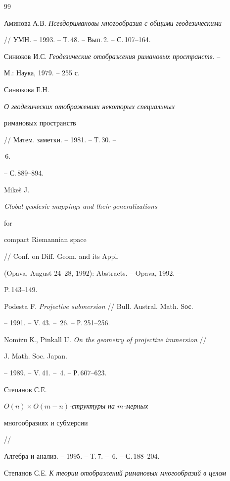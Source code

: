 \begin{thebibliography}{99} 


 




Аминова А.В. {\em Псевдоримановы многообразия с общими геодезическими} 


// УМН. -- 1993. -- Т.\,48. -- Вып.\,2. -- С.\,107--164. 




Синюков И.С. {\em Геодезические отображения римановых пространств}. -- 


М.: Наука, 1979. -- 255 с. 




Синюкова Е.Н. {\em О геодезических отображениях некоторых специальных 


римановых пространств} // Матем. заметки. -- 1981. -- Т.\,30. -- 


\No\,6. 


-- С.\,889--894. 




Mike\v{s} J. {\em Global geodesic mappings and their generalizations 


for 


compact Riemannian space} // Conf. on Diff. Geom. and its Appl. 


(Opava, August 24--28, 1992): Abstracts. -- Opava, 1992. -- 


P.\,143--149. 




Podesta F. {\em Projective submersion} // Bull. Austral. Math. Sос. 


-- 1991. -- V.\,43. -- \No\,26. -- Р.\,251--256. %




Nomizu К., Pinkall U. {\em On the geometry of projective immersion} // 


J. Math. Soc. Japan. 


-- 1989. -- V.\,41. -- \No\,4. -- Р.\,607--623. 




Степанов С.Е. {\em $O(n)\times O(m-n)$-структуры на $m$-мерных 


многообразиях и субмерсии} // 


Алгебра и анализ. -- 1995. -- Т.\,7. -- \No\,6. -- С.\,188--204. 




Степанов С.Е. {\em К теории отображений римановых многообразий в целом} 



\end{thebibliography}

